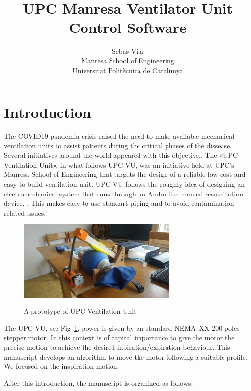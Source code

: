 \documentclass[a4paper]{article}
\title{
  UPC Manresa Ventilator Unit\\
  Control Software}
\author{
  Sebas Vila\\
  Manresa School of Engineering\\
  Universitat Politècnica de Catalunya}
\begin{document}
\maketitle{}


\section{Introduction}
\label{sec:introduction}

The COVID19 pandemia crisis raised the need to make available
mechanical ventilation units to assist patients during the critical
phases of the dissease. Several initiatives around the world appeared
with this objective,\cite{}. The «UPC Ventilation Unit», in what
follows UPC-VU, was an initiative held at UPC's Manresa School of
Engineering that targets the design of a reliable low cost and easy to
build ventilation unit. UPC-VU follows the roughly idea of designing
an electromechanical system that runs through an Ambu like manual
resuscitation device, \cite{a.s.20:_ambu_oval_silic_resus}. This makes
easy to use standart piping and to avoid contamination related issues.

\begin{figure}[tb]
  \centering
  \includegraphics[width=0.7\textwidth]{upc-vu-v1}
  \label{fig:upc-vu}
  \caption{A prototype of UPC Ventilation Unit}
\end{figure}

The UPC-VU, see Fig~\ref{fig:upc-vu}, power is given by an standard
NEMA~XX 200 poles stepper motor. In this context is of capital
importance to give the motor the precise motion to achieve the desired
inpiration/expiration behaviour. This manuscript develops an algorithm
to move the motor following a suitable profile.
We focused on the inspiration motion.


After this introduction, the manuscript is organized as follows.
\end{document}
